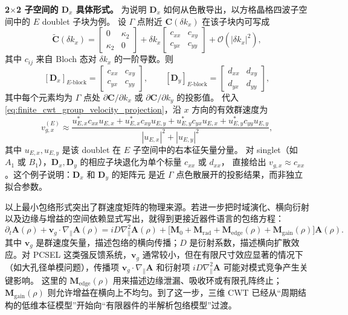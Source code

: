 \begin{ExampleBox}
\textbf{2$\bm\times$2 子空间的 $\bm D_x$ 具体形式。}
为说明 $\bm D_x$ 如何从色散导出，以方格晶格四波子空间中的 $E$ doublet 子块为例。
设 $\Gamma$ 点附近 $\bm C(\delta k_x)$ 在该子块内可写成
\[
\tilde{\bm C}(\delta k_x)=
\begin{bmatrix}
0 & \kappa_2\\
\kappa_2 & 0
\end{bmatrix}
+\delta k_x
\begin{bmatrix}
c_{xx} & c_{xy}\\
c_{yx} & c_{yy}
\end{bmatrix}
+\mathcal O(|\delta k_x|^2),
\]
其中 $c_{ij}$ 来自 Bloch 态对 $\delta k_x$ 的一阶导数。则
\[
[\bm D_x]_{E\text{-block}}
=
\begin{bmatrix}
c_{xx} & c_{xy}\\
c_{yx} & c_{yy}
\end{bmatrix},
\qquad
[\bm D_y]_{E\text{-block}}
=
\begin{bmatrix}
d_{xx} & d_{xy}\\
d_{yx} & d_{yy}
\end{bmatrix},
\]
其中每个元素均为 $\Gamma$ 点处 $\partial \bm C/\partial k_x$ 或 $\partial \bm C/\partial k_y$ 的投影值。
代入 \cref{eq:finite_cwt_group_velocity_projection}，沿 $x$ 方向的有效群速度为
\[
v_{g,x}^{(E)}\approx
\frac{u_{E,x}^{\ast}c_{xx}u_{E,x}+u_{E,x}^{\ast}c_{xy}u_{E,y}
+u_{E,y}^{\ast}c_{yx}u_{E,x}+u_{E,y}^{\ast}c_{yy}u_{E,y}}
{|u_{E,x}|^2+|u_{E,y}|^2},
\]
其中 $u_{E,x},u_{E,y}$ 是该 doublet 在 $E$ 子空间中的右本征矢量分量。
对 singlet（如 $A_1$ 或 $B_1$），$\bm D_x,\bm D_y$ 的相应子块退化为单个标量 $c_{xx}$ 或 $d_{xx}$，
直接给出 $v_{g,x}\approx c_{xx}$。这个例子说明：$\bm D_x$ 和 $\bm D_y$ 的矩阵元
是近 $\Gamma$ 点色散展开的投影结果，而非独立拟合参数。
\end{ExampleBox}

以上最小包络形式突出了群速度矩阵的物理来源。若进一步把时域演化、横向衍射以及边缘与增益的空间依赖显式写出，就得到更接近器件语言的包络方程：
\begin{equation}
\partial_t \bm{A}(\rho) + \bm{v}_g\cdot\nabla_\parallel \bm{A}(\rho)
=
i D\nabla_\parallel^2 \bm{A}(\rho)
+
\Big[
\mathbf{M}_0
+\mathbf{M}_{\mathrm{rad}}
+\mathbf{M}_{\mathrm{edge}}(\rho)
+\mathbf{M}_{\mathrm{gain}}(\rho)
\Big]\bm{A}(\rho).
\label{eq:3dcwt_envelope}
\end{equation}
其中 $\bm{v}_g$ 是群速度矢量，描述包络的横向传播；$D$ 是衍射系数，描述横向扩散效应。对 PCSEL 这类强反馈系统，$\bm{v}_g$ 通常较小，但在有限尺寸效应显著的情况下（如大孔径单模问题），传播项 $\bm{v}_g\cdot\nabla_\parallel \bm{A}$ 和衍射项 $i D\nabla_\parallel^2 \bm{A}$ 可能对模式竞争产生关键影响。
这里的 $\mathbf{M}_{\mathrm{edge}}(\rho)$ 用来描述边缘泄漏、吸收环或有限孔阵终止；$\mathbf{M}_{\mathrm{gain}}(\rho)$ 则允许增益在横向上不均匀。到了这一步，三维 CWT 已经从“周期结构的低维本征模型”开始向“有限器件的半解析包络模型”过渡。

